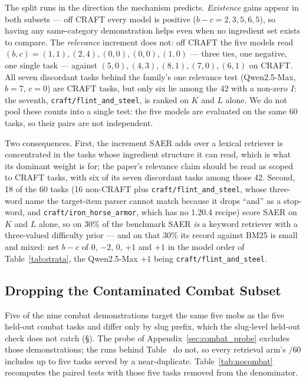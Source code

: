 \documentclass[letterpaper]{article} %
\newcommand{\appref}[1]{Appendix~\ref{#1}}
\newcommand{\bodyref}[1]{\getrefnumber{#1}}
\begin{document}
The split runs in the direction the mechanism predicts.  \emph{Existence}
gains appear in both subsets --- off CRAFT every model is positive
($b{-}c = 2, 3, 5, 6, 5$), so having any same-category demonstration helps even
when no ingredient set exists to compare.  The \emph{relevance} increment does
not: off CRAFT the five models read $(b,c) = (1,1), (2,4), (0,0), (0,0), (1,0)$
--- three ties, one negative, one single task --- against
$(5,0), (4,3), (8,1), (7,0), (6,1)$ on CRAFT.  All seven discordant tasks
behind the family's one relevance test (Qwen2.5-Max, $b{=}7$, $c{=}0$) are
CRAFT tasks, but only six lie among the 42 with a non-zero $I$: the seventh,
\texttt{craft/flint\_and\_steel}, is ranked on $K$ and $L$ alone.  We do not
pool these counts into a single test: the five models
are evaluated on the same 60 tasks, so their pairs are not independent.

Two consequences.  First, the increment SAER adds over a lexical retriever is
concentrated in the tasks whose ingredient structure it can read, which is what
its dominant weight is for; the paper's relevance claim should be read as scoped
to CRAFT tasks, with six of its seven discordant tasks among those 42.  Second,
18 of the 60 tasks (16 non-CRAFT plus \texttt{craft/flint\_and\_steel}, whose
three-word name the target-item parser cannot match because it drops ``and''
as a stop-word, and \texttt{craft/iron\_horse\_armor}, which has no 1.20.4
recipe) score SAER on $K$ and $L$ alone, so on 30\% of the benchmark SAER
\emph{is} a keyword retriever with a three-valued difficulty prior --- and on
that 30\% its record against BM25 is small and mixed: net $b{-}c$ of $0$,
$-2$, $0$, $+1$ and $+1$ in the model order of Table~\ref{tab:strata}, the
Qwen2.5-Max $+1$ being \texttt{craft/flint\_and\_steel}.

\subsection*{Dropping the Contaminated Combat Subset}
\label{app:nocombat}

Five of the nine combat demonstrations target the same five mobs as the five
held-out combat tasks and differ only by slug prefix, which the slug-level
held-out check does not catch (\S\bodyref{sec:combat_design}).  The probe of
\appref{sec:combat_probe} excludes those demonstrations; the runs behind
Table~\bodyref{tab:main} do not, so every retrieval arm's $/60$ includes up to five
tasks served by a near-duplicate.  Table~\ref{tab:nocombat} recomputes the
paired tests with those five tasks removed from the denominator.
\end{document}
